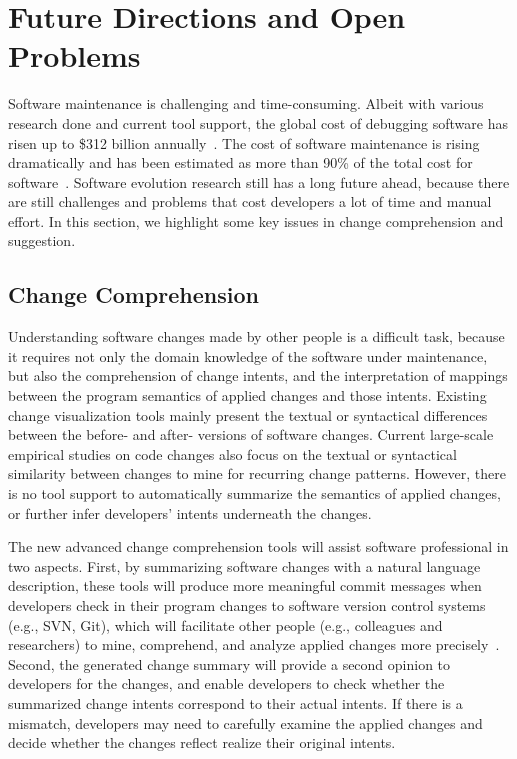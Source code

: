 \section{Future Directions and Open Problems} 

Software maintenance is challenging and time-consuming. Albeit with various research done and current tool support, the global cost of debugging software has risen up to \$312 billion annually~\cite{globalcost}. The cost of software maintenance is rising dramatically and has been estimated as more than 90\% of the total cost for software~\cite{Omnext2010}. Software evolution research still has a long future ahead, because there are still challenges and problems that cost developers a lot of time and manual effort. In this section, we highlight some key issues in change comprehension and suggestion.

\subsection{Change Comprehension}
Understanding software changes made by other people is a difficult task, because it requires not only the domain knowledge of the software under maintenance, but also the comprehension of change intents, and the interpretation of mappings between the program semantics of applied changes and those intents. Existing change visualization tools mainly present the textual or syntactical differences between the before- and after- versions of software changes. Current large-scale empirical studies on code changes also focus on the textual or syntactical similarity between changes to mine for recurring change patterns. However, there is no tool support to automatically summarize the semantics of applied changes, or further infer developers' intents underneath the changes. 

The new advanced change comprehension tools will assist software professional in two aspects. First, by summarizing software changes with a natural language description, these tools will produce more meaningful commit messages when developers check in their program changes to software version control systems (e.g., SVN, Git), which will facilitate other people (e.g., colleagues and researchers) to mine, comprehend, and analyze applied changes more precisely~\cite{herzig2013impact}. Second, the generated change summary will provide a second opinion to developers for the changes, and enable developers to check whether the summarized change intents correspond to their actual intents. If there is a mismatch, developers may need to carefully examine the applied changes and decide whether the changes reflect realize their original intents. 

